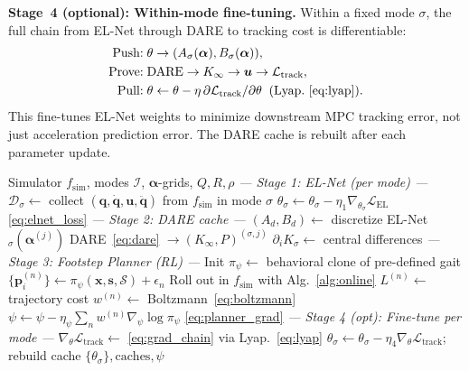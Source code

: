 \documentclass[letterpaper, 10pt, conference]{IEEEtran}
\newcommand{\balpha}{\bm{\alpha}}
\newcommand{\bx}{\bm{x}}
\newcommand{\bu}{\bm{u}}
\newcommand{\bq}{\bm{q}}
\newcommand{\bp}{\bm{p}}
\newcommand{\cS}{\mathcal{S}}
\newcommand{\cI}{\mathcal{I}}
\begin{document}
\textbf{Stage~4 (optional): Within-mode fine-tuning.}
Within a fixed mode $\sigma$, the full chain
from EL-Net through DARE to tracking cost
is differentiable:
\begin{align}
  \text{Push:}\; &\theta \to
    (A_\sigma(\balpha), B_\sigma(\balpha)),
    \notag\\
  \text{Prove:}\; &\text{DARE}
    \to K_\infty \to \bu \to
    \mathcal{L}_{\mathrm{track}},
    \label{eq:ppp_finetune}\\
  \text{Pull:}\; &\theta \gets \theta
    - \eta \, \partial \mathcal{L}_{\mathrm{track}}
    / \partial\theta
    \;\;\text{(Lyap.~\eqref{eq:lyap})}.
    \notag
\end{align}
This fine-tunes EL-Net weights to minimize downstream
MPC tracking error, not just acceleration prediction error.
The DARE cache is rebuilt after each parameter update.

\begin{algorithm}[t]
\caption{Offline Training (MuJoCo Simulator)}
\label{alg:offline}
\begin{algorithmic}[1]
\REQUIRE Simulator $f_{\mathrm{sim}}$, modes $\cI$,
  $\balpha$-grids, $Q, R, \rho$
\STATE \textit{--- Stage 1: EL-Net (per mode) ---}
\FOR{each $\sigma \in \cI$}
  \STATE $\mathcal{D}_\sigma \gets$ collect
    $(\bq, \dot{\bq}, \bu, \ddot{\bq})$
    from $f_{\mathrm{sim}}$ in mode $\sigma$
    \STATE $\theta_\sigma \gets \theta_\sigma
      - \eta_1 \nabla_{\theta_\sigma}
      \mathcal{L}_{\mathrm{EL}}$
      \hfill\eqref{eq:elnet_loss}
  \ENDFOR
\ENDFOR
\STATE \textit{--- Stage 2: DARE cache ---}
\FOR{each $\sigma \in \cI$, grid point $\balpha^{(j)}$}
  \STATE $(A_d, B_d) \gets$ discretize
    EL-Net$_\sigma(\balpha^{(j)})$
  \STATE DARE~\eqref{eq:dare}
    $\to (K_\infty, P)^{(\sigma, j)}$
  \STATE $\partial_i K_\sigma \gets$ central differences
\ENDFOR
\STATE \textit{--- Stage 3: Footstep Planner (RL) ---}
\STATE Init $\pi_\psi \gets$
  behavioral clone of pre-defined gait
    \STATE $\{\bp_i^{(n)}\} \gets
      \pi_\psi(\bx, \bm{s}, \cS) + \epsilon_n$
    \STATE Roll out in $f_{\mathrm{sim}}$
      with Alg.~\ref{alg:online}
    \STATE $L^{(n)} \gets$ trajectory cost
  \ENDFOR
  \STATE $w^{(n)} \gets$ Boltzmann~\eqref{eq:boltzmann}
  \STATE $\psi \gets \psi
    - \eta_\psi \sum_n w^{(n)}
      \nabla_\psi \log \pi_\psi$
    \hfill\eqref{eq:planner_grad}
\ENDFOR
\STATE \textit{--- Stage 4 (opt): Fine-tune per mode ---}
  \STATE $\nabla_\theta \mathcal{L}_{\mathrm{track}}
    \gets$ \eqref{eq:grad_chain} via Lyap.~\eqref{eq:lyap}
  \STATE $\theta_\sigma \gets \theta_\sigma
    - \eta_4 \nabla_\theta \mathcal{L}_{\mathrm{track}}$;
    rebuild cache
\ENDFOR
\RETURN $\{\theta_\sigma\}, \text{caches}, \psi$
\end{algorithmic}
\end{algorithm}
\end{document}
